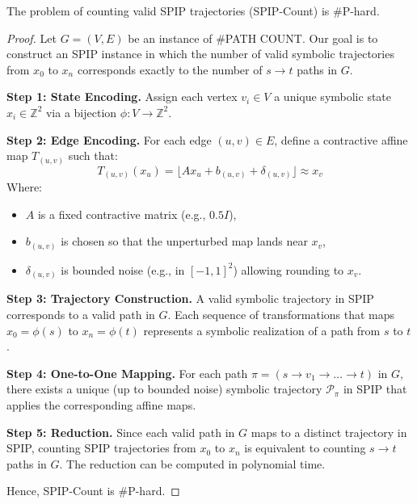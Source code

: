 \documentclass[10pt,a4paper]{amsart}
\renewcommand{\qedsymbol}{}  %
\begin{document}
\begin{theorem}
The problem of counting valid SPIP trajectories (SPIP-Count) is \#P-hard.
\end{theorem}

\begin{proof}
Let $G = (V, E)$ be an instance of \#PATH COUNT. Our goal is to construct an SPIP instance in which the number of valid symbolic trajectories from $x_0$ to $x_n$ corresponds exactly to the number of $s \rightarrow t$ paths in $G$.

\textbf{Step 1: State Encoding.} Assign each vertex $v_i \in V$ a unique symbolic state $x_i \in \mathbb{Z}^2$ via a bijection $\phi: V \rightarrow \mathbb{Z}^2$.

\textbf{Step 2: Edge Encoding.} For each edge $(u,v) \in E$, define a contractive affine map $T_{(u,v)}$ such that:
\[
T_{(u,v)}(x_u) = \lfloor A x_u + b_{(u,v)} + \delta_{(u,v)} \rfloor \approx x_v
\]
Where:
\begin{itemize}
    \item $A$ is a fixed contractive matrix (e.g., $0.5I$),
    \item $b_{(u,v)}$ is chosen so that the unperturbed map lands near $x_v$,
    \item $\delta_{(u,v)}$ is bounded noise (e.g., in $[-1,1]^2$) allowing rounding to $x_v$.
\end{itemize}

\textbf{Step 3: Trajectory Construction.} A valid symbolic trajectory in SPIP corresponds to a valid path in $G$. Each sequence of transformations that maps $x_0 = \phi(s)$ to $x_n = \phi(t)$ represents a symbolic realization of a path from $s$ to $t$.

\textbf{Step 4: One-to-One Mapping.} For each path $\pi = (s \rightarrow v_1 \rightarrow \dots \rightarrow t)$ in $G$, there exists a unique (up to bounded noise) symbolic trajectory $\mathcal{P}_\pi$ in SPIP that applies the corresponding affine maps.

\textbf{Step 5: Reduction.} Since each valid path in $G$ maps to a distinct trajectory in SPIP, counting SPIP trajectories from $x_0$ to $x_n$ is equivalent to counting $s \rightarrow t$ paths in $G$. The reduction can be computed in polynomial time.

Hence, SPIP-Count is \#P-hard. \renewcommand{\qedsymbol}{}
\end{proof}
\end{document}

